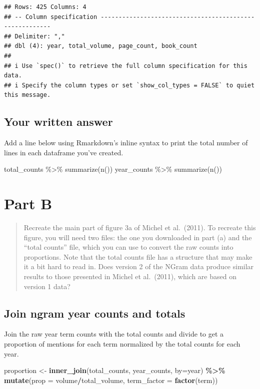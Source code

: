 \documentclass[
]{article}
\newenvironment{Shaded}{\begin{snugshade}}{\end{snugshade}}
\newcommand{\AttributeTok}[1]{\textcolor[rgb]{0.13,0.29,0.53}{#1}}
\newcommand{\FunctionTok}[1]{\textcolor[rgb]{0.13,0.29,0.53}{\textbf{#1}}}
\newcommand{\NormalTok}[1]{#1}
\newcommand{\OtherTok}[1]{\textcolor[rgb]{0.56,0.35,0.01}{#1}}
\newcommand{\SpecialCharTok}[1]{\textcolor[rgb]{0.81,0.36,0.00}{\textbf{#1}}}
\newcommand{\StringTok}[1]{\textcolor[rgb]{0.31,0.60,0.02}{#1}}
\begin{document}
\begin{verbatim}
## Rows: 425 Columns: 4
## -- Column specification --------------------------------------------------------
## Delimiter: ","
## dbl (4): year, total_volume, page_count, book_count
## 
## i Use `spec()` to retrieve the full column specification for this data.
## i Specify the column types or set `show_col_types = FALSE` to quiet this message.
\end{verbatim}

\hypertarget{your-written-answer}{%
\subsection{Your written answer}\label{your-written-answer}}

Add a line below using Rmarkdown's inline syntax to print the total
number of lines in each dataframe you've created.

total\_counts \%\textgreater\% summarize(n()) year\_counts
\%\textgreater\% summarize(n())

\hypertarget{part-b}{%
\section{Part B}\label{part-b}}

\begin{quote}
Recreate the main part of figure 3a of Michel et al.~(2011). To recreate
this figure, you will need two files: the one you downloaded in part (a)
and the ``total counts'' file, which you can use to convert the raw
counts into proportions. Note that the total counts file has a structure
that may make it a bit hard to read in. Does version 2 of the NGram data
produce similar results to those presented in Michel et al.~(2011),
which are based on version 1 data?
\end{quote}

\hypertarget{join-ngram-year-counts-and-totals}{%
\subsection{Join ngram year counts and
totals}\label{join-ngram-year-counts-and-totals}}

Join the raw year term counts with the total counts and divide to get a
proportion of mentions for each term normalized by the total counts for
each year.

\begin{Shaded}
\begin{Highlighting}[]
\NormalTok{proportion }\OtherTok{\textless{}{-}} \FunctionTok{inner\_join}\NormalTok{(total\_counts, year\_counts, }\AttributeTok{by=}\StringTok{\textquotesingle{}year\textquotesingle{}}\NormalTok{) }\SpecialCharTok{\%\textgreater{}\%} \FunctionTok{mutate}\NormalTok{(}\StringTok{\textquotesingle{}prop\textquotesingle{}} \OtherTok{=}\NormalTok{ volume}\SpecialCharTok{/}\NormalTok{total\_volume, }\StringTok{\textquotesingle{}term\_factor\textquotesingle{}} \OtherTok{=} \FunctionTok{factor}\NormalTok{(term))}
\end{Highlighting}
\end{Shaded}
\end{document}
